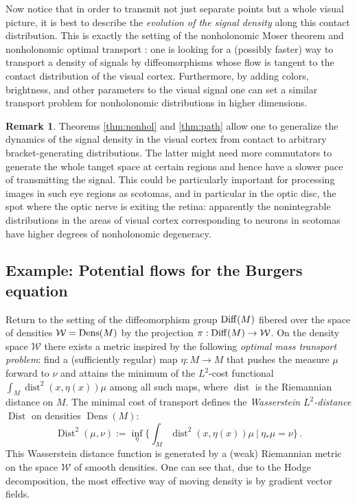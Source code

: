 \documentclass[11pt]{article}
\theoremstyle{definition}
\newtheorem{remark}[lemma]{Remark}
\newcounter{ai}
\begin{document}
Now notice that in order to transmit not just separate points but a whole visual picture, it is best to describe 
the {\it evolution of the signal density} along this contact distribution. This is exactly the setting of the nonholonomic Moser theorem and nonholonomic optimal transport \cite{khesin2009nonholonomic, agrachev2009optimal}: one is looking for a (possibly faster) way to transport a density of signals by diffeomorphisms whose flow is tangent to the contact distribution of the visual cortex. Furthermore, by adding colors, brightness,  and other parameters to the visual signal one can set a similar transport problem for nonholonomic distributions in higher dimensions.

\begin{remark}
    Theorems \ref{thm:nonhol} and \ref{thm:path} allow one to generalize  the dynamics of the signal density
    in the visual cortex from contact to arbitrary bracket-generating distributions. The latter might need more commutators to generate the whole tanget space at certain regions and hence have a slower pace of transmitting the signal. This could be particularly important for processing images in such eye regions as scotomas, and in particular in the optic disc, the spot where the optic nerve is exiting the retina: apparently the nonintegrable distributions in the areas of visual cortex corresponding to neurons in scotomas have higher degrees of nonholonomic degeneracy.  
\end{remark}
\medskip

\subsection{Example: Potential flows for the Burgers equation}
\label{sec:burgers}

Return to the setting of the diffeomorphism group ${\rm Diff}(M)$ fibered over the space of densities
${\mathcal{W}}={\rm Dens}(M)$ by the projection $\pi: {\rm Diff}(M)\to \mathcal W$.
On the density space $\mathcal{W}$  there  exists a metric 
inspired by the following  {\it optimal mass
transport problem}: find a (sufficiently regular) map $\eta:M\to M$ that pushes
the  measure $\mu$ forward to $\nu$ and attains the minimum
of the $L^2$-cost functional 
$\int_M \operatorname{dist}^2(x,\eta(x))\mu$ among all such maps, where $\operatorname{dist}$ is the Riemannian distance on $M$.
The minimal cost of transport defines the  
{\it Wasserstein $L^2$-distance} ${\operatorname{Dist}}$ on densities $\operatorname{Dens}(M)$:
$$
{\operatorname{Dist}}^2(\mu, \nu)
:=\inf_\eta\Big\{\int_M \operatorname{dist}^2(x,\eta(x))\mu~
|~\eta_*\mu=\nu\Big\}\,.
$$
This Wasserstein distance function is  
generated by a (weak) Riemannian metric on the space $\mathcal{W}$ of smooth densities.
One can see that, due to the Hodge decomposition,  the most effective way of moving density is by gradient vector fields. 
\end{document}
